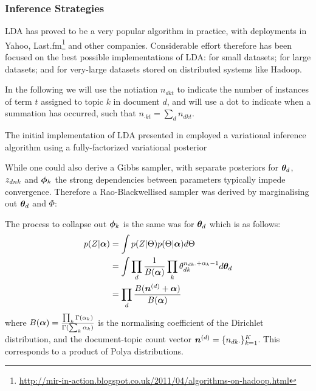 

\subsubsection{Inference Strategies}
LDA has proved to be a very popular algorithm in practice, with deployments in Yahoo\cite{Ahmed2011a}, Last.fm\footnote{\url{http://mir-in-action.blogspot.co.uk/2011/04/algorithms-on-hadoop.html}} and other companies. Considerable effort therefore has been focused on the best possible implementations of LDA: for small datasets; for large datasets; and for very-large datasets stored on distributed systems like Hadoop.

In the following we will use the notiation $n_{dkt}$ to indicate the number of instances of term $t$ assigned to topic $k$ in document $d$, and will use a dot to indicate when a summation has occurred, such that $n_{\cdot k t} = \sum_d n_{dkt}$.



The initial implementation of LDA presented in \cite{BleiNgJordan2003} employed a variational inference algorithm using a fully-factorized variational posterior

While one could also derive a Gibbs sampler, with separate posteriors for ${ \bm \theta_d }$, ${ z_{dnk} }$ and ${ \bm \phi_k }$ \cite{Pritchard2000} the strong dependencies between parameters typically impede convergence\cite{CasellaRobert1999}. Therefore \cite{Griffiths2004} a Rao-Blackwellised sampler was derived by marginalising out ${ \bm \theta_d }$ and $\Phi$:

The process to collapse out ${ \bm \phi_k }$ is the same was for ${ \bm \theta_d }$ which is as follows:
\begin{align}
p(Z|\bm \alpha) & = \int p(Z|\Theta)p(\Theta|\bm \alpha) d\Theta \\
& = \int \prod_d \frac{1}{ {B(\bm \alpha)} } \prod_k \theta_{dk}^{n_{dk\cdot} + \alpha_k - 1} d{ \bm \theta_d } \\
& = \prod_d \frac{B(\bm n^{(d)} + \bm \alpha)}{B(\bm \alpha)}
\end{align}
where $B(\bm \alpha) = \frac{\prod_k \Gamma(\alpha_k)}{\Gamma(\sum_k \alpha_k)}$ is the normalising coefficient of the Dirichlet distribution, and the document-topic count vector $\bm n^{(d)} = \{ n_{dk\cdot} \}_{k=1}^K$. This corresponds to a product of Polya distributions.


